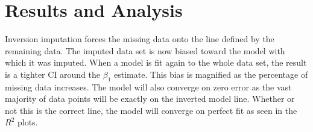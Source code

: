 \documentclass[../paper.tex]{subfiles}
\begin{document}
\section{Results and Analysis}

Inversion imputation forces the missing data onto the line defined by the remaining data. The imputed data set is now biased
toward the model with which it was imputed. When a model is fit again to the whole data set, the result is a
tighter CI around the $\beta_{1}$ estimate. This bias is magnified as the percentage of missing data increases. The model will
also converge on zero error as the vast majority of data points will be exactly on the inverted model line. Whether or
not this is the correct line, the model will converge on perfect fit as seen in the $R^2$ plots.
\end{document}
